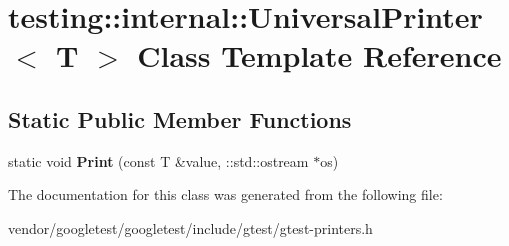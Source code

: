 \hypertarget{classtesting_1_1internal_1_1_universal_printer}{}\section{testing\+:\+:internal\+:\+:Universal\+Printer$<$ T $>$ Class Template Reference}
\label{classtesting_1_1internal_1_1_universal_printer}
\subsection*{Static Public Member Functions}
\begin{DoxyCompactItemize}
\item 
\mbox{\label{classtesting_1_1internal_1_1_universal_printer_aecec021e1abbaa260b701e24e3fe33eb}} 
static void {\bfseries Print} (const T \&value, \+::std\+::ostream $\ast$os)
\end{DoxyCompactItemize}


The documentation for this class was generated from the following file\+:\begin{DoxyCompactItemize}
\item 
vendor/googletest/googletest/include/gtest/gtest-\/printers.\+h\end{DoxyCompactItemize}
